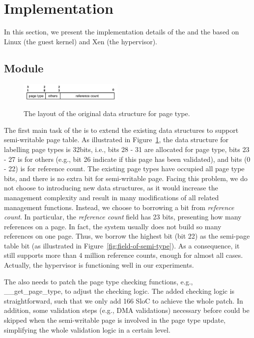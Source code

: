 \section{Implementation} \label{sec:impl}
In this section, we present the implementation details of the \module and the \cache based on Linux (the guest kernel) and Xen (the hypervisor).

\subsection{\name Module}
\begin{figure}[ht]
\centering
\includegraphics[width=0.45\textwidth]{image/implementation/field-of-page-type-info.jpg} \\
\caption{The layout of the original data structure for page type.}
\label{fig:field-of-page-type-info}
\end{figure}
The first main task of the \module is to extend the existing data structures to support semi-writable page table.
As illustrated in Figure~\ref{fig:field-of-page-type-info}, the data structure for labelling page types is 32bits, i.e., bits 28 - 31 are allocated for page type, bits 23 - 27 is for others (e.g., bit 26 indicate if this page has been validated), and bits (0 - 22) is for reference count.
The existing page types have occupied all page type bits, and there is no extra bit for semi-writable page.
Facing this problem, we do not choose to introducing new data structures, as it would increase the management complexity and result in many modifications of all related management functions.
Instead, we choose to borrowing a bit from \emph{reference count}.
In particular, the \emph{reference count} field has 23 bits, presenting how many references on a page. 
In fact, the system usually does not build so many references on one page. Thus, we borrow the highest bit (bit 22) as the semi-page table bit (as illustrated in Figure~\ref{fig:field-of-semi-type}).
As a consequence, it still supports more than 4 million reference counts, enough for almost all cases. 
Actually, the hypervisor is functioning well in our experiments.

The \module also needs to patch the page type checking functions, e.g., \_\_get\_page\_type, to adjust the checking logic. 
The added checking logic is straightforward, such that we only add 166 SloC to achieve the whole patch.
In addition, some validation steps (e.g., DMA validations) necessary before could be skipped when the semi-writable page is involved in the page type update, simplifying the whole validation logic in a certain level. 

